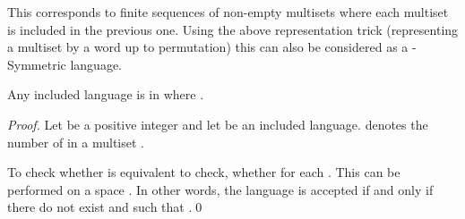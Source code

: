 \documentclass[UKenglish]{llncs}
\begin{document}
This corresponds to finite sequences of non-empty multisets where each
multiset is included in the previous one. Using the above
representation trick (representing a multiset by a word up to
permutation) this can also be considered as a -Symmetric
language.


\begin{proposition}
Any included language  is in  where .
\end{proposition}
\begin{proof}
Let  be a positive integer and let  be an included language.
 denotes the number of  in a multiset . 

To check whether   is equivalent to check, whether 
for each . 
This can be performed on a space . 
In other words,  the language is accepted if and only if there do not exist  and  such that
.\hfill \qed

\end{proof}
\end{document}
